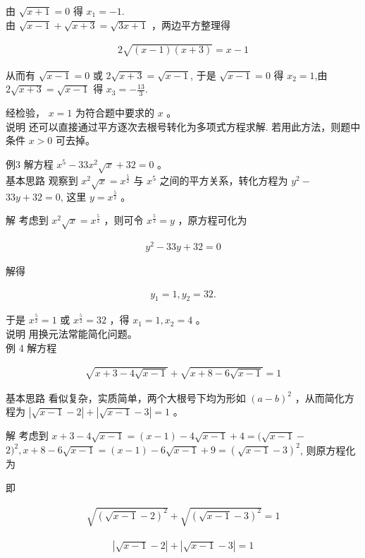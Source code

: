 \documentclass[10pt]{article}
\begin{document}
由 $\sqrt{x+1}=0$ 得 $x_{1}=-1$.\\
由 $\sqrt{x-1}+\sqrt{x+3}=\sqrt{3 x+1}$ ，两边平方整理得

\begin{align*}
2 \sqrt{(x-1)(x+3)}=x-1
\end{align*}

从而有 $\sqrt{x-1}=0$ 或 $2 \sqrt{x+3}=\sqrt{x-1}$, 于是 $\sqrt{x-1}=0$ 得 $x_{2}=1$,由 $2 \sqrt{x+3}=\sqrt{x-1}$ 得 $x_{3}=-\frac{13}{3}$.

经检验， $x=1$ 为符合题中要求的 $x$ 。\\
说明 还可以直接通过平方逐次去根号转化为多项式方程求解. 若用此方法，则题中条件 $x>0$ 可去掉。

例3 解方程 $x^{5}-33 x^{2} \sqrt{x}+32=0$ 。\\
基本思路 观察到 $x^{2} \sqrt{x}=x^{\frac{5}{2}}$ 与 $x^{5}$ 之间的平方关系，转化方程为 $y^{2}-$ $33 y+32=0$, 这里 $y=x^{\frac{5}{2}}$ 。

解 考虑到 $x^{2} \sqrt{x}=x^{\frac{5}{2}}$ ，则可令 $x^{\frac{5}{2}}=y$ ，原方程可化为

\begin{align*}
y^{2}-33 y+32=0
\end{align*}

解得

\begin{align*}
y_{1}=1, y_{2}=32 .
\end{align*}

于是 $x^{\frac{5}{2}}=1$ 或 $x^{\frac{5}{2}}=32$ ，得 $x_{1}=1, x_{2}=4$ 。\\
说明 用换元法常能简化问题。\\
例 4 解方程

\begin{align*}
\sqrt{x+3-4 \sqrt{x-1}}+\sqrt{x+8-6 \sqrt{x-1}}=1
\end{align*}

基本思路 看似复杂，实质简单，两个大根号下均为形如 $(a-b)^{2}$ ，从而简化方程为 $|\sqrt{x-1}-2|+|\sqrt{x-1}-3|=1$ 。

解 考虑到 $x+3-4 \sqrt{x-1}=(x-1)-4 \sqrt{x-1}+4=(\sqrt{x-1}-$ $2)^{2}, x+8-6 \sqrt{x-1}=(x-1)-6 \sqrt{x-1}+9=(\sqrt{x-1}-3)^{2}$, 则原方程化为

即

\begin{align*}
\sqrt{(\sqrt{x-1}-2)^{2}}+\sqrt{(\sqrt{x-1}-3)^{2}}=1
\end{align*}

\begin{align*}
|\sqrt{x-1}-2|+|\sqrt{x-1}-3|=1
\end{align*}
\end{document}
